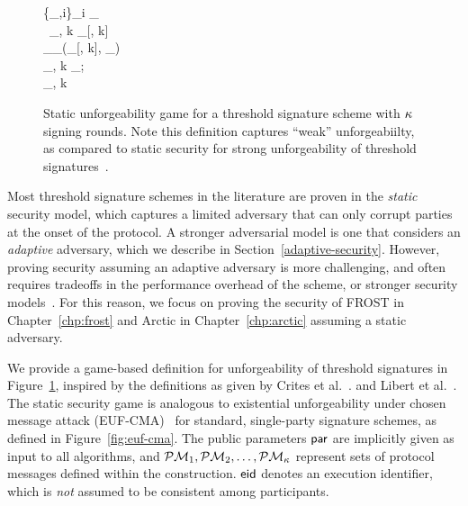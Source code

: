 \begin{figure}[!htb]
\begin{pchstack}[boxed]
\begin{pcvstack}
{			\pcparse \{\PM_{,i}\}_{i \in \coalition} \gets \PM_{} \\
			\pcreturn \bot~\pcif \PM_{, k} \neq \PM_{}[\ssid, k] \\
				\PM_\numrounds[\ssid, k] \gets  \Sign_\numrounds(\state_{}[\ssid, k], \PM_{}) \\
				\PM_{\numrounds, k} \gets \PM_\numrounds[\ssid, k];~\round[\ssid, k] \gets \numrounds \\
       		 	\pcreturn \PM_{\numrounds, k}
		}
		\end{pcvstack}
	\end{pchstack}
\caption[Static unforgeability game for a threshold signature scheme.]
{
Static unforgeability game for a threshold signature scheme with $\kappa$ signing rounds.
Note this definition captures ``weak'' unforgeabiilty,
as compared to static security for strong unforgeability of threshold
signatures~\cite{BellareCKMTZ22}.
}
\label{fig:euf-cma-threshold}
\end{figure}



Most threshold signature schemes in the literature are proven in the \emph{static} security model,
which captures a limited adversary that can only corrupt parties at the onset of the protocol.
A stronger adversarial model is one that considers an \emph{adaptive} adversary,
which we describe in Section~\ref{adaptive-security}.
However, proving security assuming an adaptive adversary is more challenging,
and often requires tradeoffs in the performance overhead of the scheme,
or stronger security models~\cite{CritesKM23,BachoL22}.
For this reason,
we focus on proving the security of FROST in Chapter~\ref{chp:frost} and Arctic in Chapter~\ref{chp:arctic} assuming a static adversary.

We provide a game-based definition for unforgeability of threshold signatures in Figure~\ref{fig:euf-cma-threshold},
inspired by the definitions as given by Crites et al.~\cite{CritesKM23}.
and Libert et al.~\cite{LibertJY16}.
The static security game is analogous to existential unforgeability under chosen message attack (EUF-CMA)~\cite{GoldwasserMR88} for standard, single-party signature schemes,
as defined in Figure~\ref{fig:euf-cma}.
The public parameters $\mathsf{par}$ are implicitly given as input to all algorithms,
and $\mathcal{PM}_1, \mathcal{PM}_2, \dots, \mathcal{PM}_\kappa$ represent sets of protocol messages defined within the construction.
$\mathsf{eid}$ denotes an execution identifier,
which is \emph{not} assumed to be consistent among participants.

